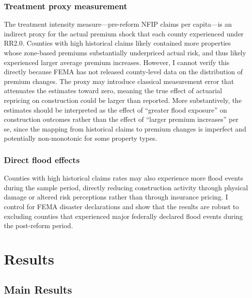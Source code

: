\documentclass[12pt]{article}
\begin{document}
\subsubsection*{Treatment proxy measurement} The treatment intensity measure---pre-reform NFIP claims per capita---is an indirect proxy for the actual premium shock that each county experienced under RR2.0. Counties with high historical claims likely contained more properties whose zone-based premiums substantially underpriced actual risk, and thus likely experienced larger average premium increases. However, I cannot verify this directly because FEMA has not released county-level data on the distribution of premium changes. The proxy may introduce classical measurement error that attenuates the estimates toward zero, meaning the true effect of actuarial repricing on construction could be larger than reported. More substantively, the estimates should be interpreted as the effect of ``greater flood exposure'' on construction outcomes rather than the effect of ``larger premium increases'' per se, since the mapping from historical claims to premium changes is imperfect and potentially non-monotonic for some property types.

\subsubsection*{Direct flood effects} Counties with high historical claims rates may also experience more flood events during the sample period, directly reducing construction activity through physical damage or altered risk perceptions rather than through insurance pricing. I control for FEMA disaster declarations and show that the results are robust to excluding counties that experienced major federally declared flood events during the post-reform period.


\section{Results}
\label{sec:results}

\subsection{Main Results}


\end{document}
